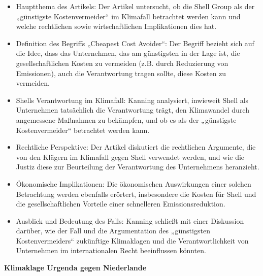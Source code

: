 \documentclass[a4paper, 12pt]{article} %
\begin{document}
\begin{itemize}
   \item Hauptthema des Artikels: Der Artikel untersucht, ob die Shell Group als der „günstigste Kostenvermeider“ im Klimafall betrachtet werden kann und welche rechtlichen sowie wirtschaftlichen Implikationen dies hat.
   \item Definition des Begriffs „Cheapest Cost Avoider“: Der Begriff bezieht sich auf die Idee, dass das Unternehmen, das am günstigsten in der Lage ist, die gesellschaftlichen Kosten zu vermeiden (z.B. durch Reduzierung von Emissionen), auch die Verantwortung tragen sollte, diese Kosten zu vermeiden.
   \item Shells Verantwortung im Klimafall: Kanning analysiert, inwieweit Shell als Unternehmen tatsächlich die Verantwortung trägt, den Klimawandel durch angemessene Maßnahmen zu bekämpfen, und ob es als der „günstigste Kostenvermeider“ betrachtet werden kann.
   \item Rechtliche Perspektive: Der Artikel diskutiert die rechtlichen Argumente, die von den Klägern im Klimafall gegen Shell verwendet werden, und wie die Justiz diese zur Beurteilung der Verantwortung des Unternehmens heranzieht.
   \item Ökonomische Implikationen: Die ökonomischen Auswirkungen einer solchen Betrachtung werden ebenfalls erörtert, insbesondere die Kosten für Shell und die gesellschaftlichen Vorteile einer schnelleren Emissionsreduktion.
   \item Ausblick und Bedeutung des Falls: Kanning schließt mit einer Diskussion darüber, wie der Fall und die Argumentation des „günstigsten Kostenvermeiders“ zukünftige Klimaklagen und die Verantwortlichkeit von Unternehmen im internationalen Recht beeinflussen könnten.
\end{itemize}

\textbf{\cite{KlimaklageUrgendaGegen} Klimaklage Urgenda gegen Niederlande}
\end{document}
